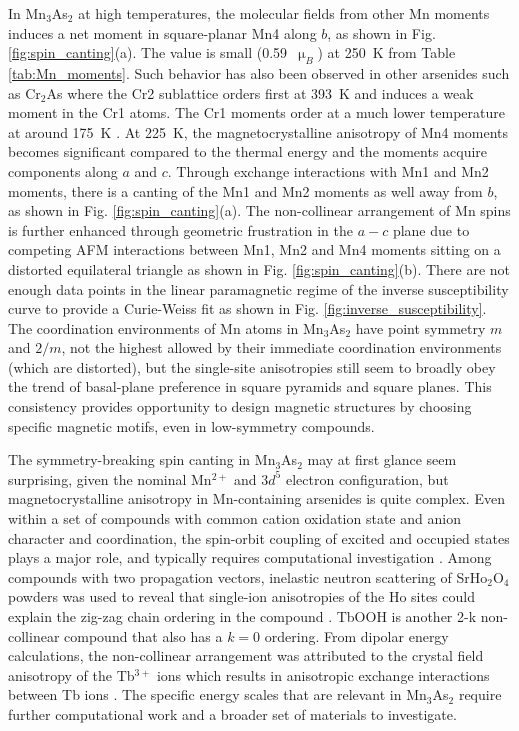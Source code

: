 \documentclass[letterpaper,10pt,doublespacing,edeposit]{uiucthesis2020}
\begin{document}
\begin{mainmatter}
In Mn$_3$As$_2$ at high temperatures, the molecular fields from other Mn moments induces a net moment in square-planar Mn4 along $b$, as shown in Fig. \ref{fig:spin_canting}(a). The value is small (0.59~$\upmu_B$) at 250~K from Table \ref{tab:Mn_moments}. Such behavior has also been observed in other arsenides such as Cr$_2$As where the Cr2 sublattice orders first at 393~K and induces a weak moment in the Cr1 atoms. The Cr1 moments order at a much lower temperature at around 175~K \cite{Ishimoto1995}.
At 225~K, the magnetocrystalline anisotropy of Mn4 moments becomes significant compared to the thermal energy and the moments acquire components along $a$ and $c$. Through exchange interactions with Mn1 and Mn2 moments, there is a canting of the Mn1 and Mn2 moments as well away from $b$, as shown in Fig. \ref{fig:spin_canting}(a). The non-collinear arrangement of Mn spins is further enhanced through geometric frustration in the $a-c$ plane due to competing AFM interactions between Mn1, Mn2 and Mn4 moments sitting on a distorted equilateral triangle as shown in Fig. \ref{fig:spin_canting}(b). There are not enough data points in the linear paramagnetic regime of the inverse susceptibility curve to provide a Curie-Weiss fit as shown in Fig. \ref{fig:inverse_susceptibility}.
The coordination environments of Mn atoms in Mn$_3$As$_2$ have point symmetry $m$ and $2/m$, not the highest allowed by their immediate coordination environments (which are distorted), but the single-site anisotropies still seem to broadly obey the trend of basal-plane preference in square pyramids and square planes.  This consistency provides opportunity to design magnetic structures by choosing specific magnetic motifs, even in low-symmetry compounds. 

The symmetry-breaking spin canting in Mn$_3$As$_2$ may at first glance seem surprising, given the nominal Mn$^{2+}$ and $3d^5$ electron configuration, but magnetocrystalline anisotropy in Mn-containing arsenides is  quite complex. Even within a set of compounds with common cation oxidation state and anion character and coordination, the spin-orbit coupling of excited and occupied states plays a major role, and typically requires computational investigation \cite{Duboc2016}.
Among compounds with two propagation vectors, inelastic neutron scattering of SrHo$_2$O$_4$ powders was used to reveal that single-ion anisotropies of the Ho sites could explain the zig-zag chain ordering in the compound \cite{Fennell2014}. TbOOH is another 2-k non-collinear compound that also has a $k = 0$ ordering. From dipolar energy calculations, the non-collinear arrangement was attributed to the crystal field anisotropy of the Tb$^{3+}$ ions which results in anisotropic exchange interactions between Tb ions \cite{Christensen1974}.
The specific energy scales that are relevant in Mn$_3$As$_2$ require further computational work and a broader set of materials to investigate. 


\end{mainmatter}
\end{document}
